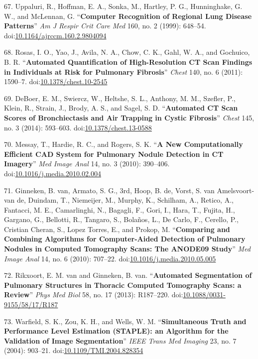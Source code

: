 \documentclass[11pt,]{article}
\begin{document}
67. Uppaluri, R., Hoffman, E. A., Sonka, M., Hartley, P. G.,
Hunninghake, G. W., and McLennan, G. ``\textbf{Computer Recognition of
Regional Lung Disease Patterns}'' \emph{Am J Respir Crit Care Med} 160,
no. 2 (1999): 648--54.
doi:\href{http://dx.doi.org/10.1164/ajrccm.160.2.9804094}{10.1164/ajrccm.160.2.9804094}

68. Rosas, I. O., Yao, J., Avila, N. A., Chow, C. K., Gahl, W. A., and
Gochuico, B. R. ``\textbf{Automated Quantification of High-Resolution CT
Scan Findings in Individuals at Risk for Pulmonary Fibrosis}''
\emph{Chest} 140, no. 6 (2011): 1590--7.
doi:\href{http://dx.doi.org/10.1378/chest.10-2545}{10.1378/chest.10-2545}

69. DeBoer, E. M., Swiercz, W., Heltshe, S. L., Anthony, M. M., Szefler,
P., Klein, R., Strain, J., Brody, A. S., and Sagel, S. D.
``\textbf{Automated CT Scan Scores of Bronchiectasis and Air Trapping in
Cystic Fibrosis}'' \emph{Chest} 145, no. 3 (2014): 593--603.
doi:\href{http://dx.doi.org/10.1378/chest.13-0588}{10.1378/chest.13-0588}

70. Messay, T., Hardie, R. C., and Rogers, S. K. ``\textbf{A New
Computationally Efficient CAD System for Pulmonary Nodule Detection in
CT Imagery}'' \emph{Med Image Anal} 14, no. 3 (2010): 390--406.
doi:\href{http://dx.doi.org/10.1016/j.media.2010.02.004}{10.1016/j.media.2010.02.004}

71. Ginneken, B. van, Armato, S. G., 3rd, Hoop, B. de, Vorst, S. van
Amelsvoort-van de, Duindam, T., Niemeijer, M., Murphy, K., Schilham, A.,
Retico, A., Fantacci, M. E., Camarlinghi, N., Bagagli, F., Gori, I.,
Hara, T., Fujita, H., Gargano, G., Bellotti, R., Tangaro, S., Bola{ñ}os,
L., De Carlo, F., Cerello, P., Cristian Cheran, S., Lopez Torres, E.,
and Prokop, M. ``\textbf{Comparing and Combining Algorithms for
Computer-Aided Detection of Pulmonary Nodules in Computed Tomography
Scans: The ANODE09 Study}'' \emph{Med Image Anal} 14, no. 6 (2010):
707--22.
doi:\href{http://dx.doi.org/10.1016/j.media.2010.05.005}{10.1016/j.media.2010.05.005}

72. Rikxoort, E. M. van and Ginneken, B. van. ``\textbf{Automated
Segmentation of Pulmonary Structures in Thoracic Computed Tomography
Scans: a Review}'' \emph{Phys Med Biol} 58, no. 17 (2013): R187--220.
doi:\href{http://dx.doi.org/10.1088/0031-9155/58/17/R187}{10.1088/0031-9155/58/17/R187}

73. Warfield, S. K., Zou, K. H., and Wells, W. M. ``\textbf{Simultaneous
Truth and Performance Level Estimation (STAPLE): an Algorithm for the
Validation of Image Segmentation}'' \emph{IEEE Trans Med Imaging} 23,
no. 7 (2004): 903--21.
doi:\href{http://dx.doi.org/10.1109/TMI.2004.828354}{10.1109/TMI.2004.828354}
\end{document}
